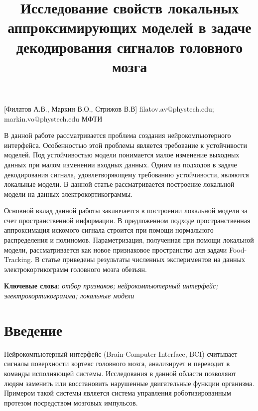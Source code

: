 \documentclass[12pt, twoside]{article}
\begin{document}
\title
    [Исследование свойств локальных моделей] %
    {Исследование свойств локальных аппроксимирующих моделей в задаче декодирования сигналов головного мозга}
\author
[] %
{} %
[Филатов А.В., Маркин В.О., Стрижов В.В] %
\email
{filatov.av@phystech.edu; markin.vo@phystech.edu}
\organization
{МФТИ}
\abstract
    {
		В данной работе рассматривается проблема создания нейрокомпьютерного интерфейса. Особенностью этой проблемы является требование к устойчивости моделей. Под устойчивостью модели понимается малое изменение выходных данных при малом изменении входных данных. Одним из подходов в задаче декодирования сигнала, удовлетворяющему требованию устойчивости, являются локальные модели. В данной статье рассматривается построение локальной модели на данных электрокортикограммы.
		
		Основной вклад данной работы заключается в  построении локальной модели за счет пространственной информации. В предложенном подходе  пространственная аппроксимация искомого сигнала строится при помощи нормального распределения и полиномов. Параметризация, полученная при помощи локальной модели, рассматривается как новое признаковое пространство для задачи Food-Tracking. В статье приведены результаты численных экспериментов на данных электрокортикограмм головного мозга обезъян.
		
\bigskip
\noindent
\textbf{Ключевые слова}: \emph {отбор признаков; нейрокомпьютерный интерфейс; электрокортикограмма; локальные модели }
}

\maketitle
\section{Введение}
Нейрокомпьютерный интерфейс (Brain-Computer Interface, BCI) \cite{shih2012brain} 
считывает сигналы поверхности кортекс головного мозга, анализирует и переводит в команды исполняющей системы. Исследования в данной области позволяют людям заменить или восстановить нарушенные двигательные функции организма. Примером такой системы является система управления роботизированным протезом посредством мозговых импульсов. 
\end{document}
